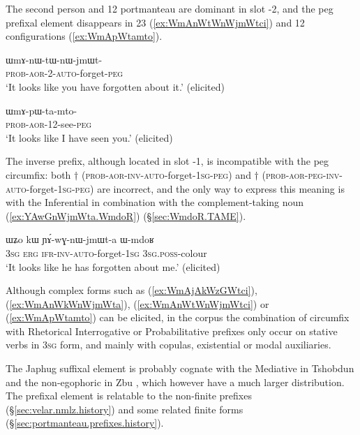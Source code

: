 The second person  and 1\fl{}2 portmanteau  are dominant in slot -2, and the peg prefixal element   disappears in 2\fl{}3 (\ref{ex:WmAnWtWnWjmWtci}) and 1\fl{}2 configurations (\ref{ex:WmApWtamto}).  

\begin{exe}
\ex \label{ex:WmAnWtWnWjmWtci}
\gll ɯmɤ-nɯ-tɯ-nɯ-jmɯt- \\
\textsc{prob}-\textsc{aor}-2-\textsc{auto}-forget-\textsc{peg} \\
\glt `It looks like you have forgotten about it.' (elicited)
\end{exe}

\begin{exe}
\ex \label{ex:WmApWtamto}
\gll ɯmɤ-pɯ-ta-mto-  \\
\textsc{prob}-\textsc{aor}-1\fl{}2-see-\textsc{peg} \\
\glt `It looks like I have seen you.' (elicited)
\end{exe}

The inverse prefix, although located in slot -1, is incompatible with the peg circumfix: both $\dagger$ (\textsc{prob}-\textsc{aor}-\textsc{inv}-\textsc{auto}-forget-\textsc{1sg}-\textsc{peg}) and $\dagger$ (\textsc{prob}-\textsc{aor}-\textsc{peg}-\textsc{inv}-\textsc{auto}-forget-\textsc{1sg}-\textsc{peg}) are incorrect, and the only way to express this meaning is with the Inferential in combination with the complement-taking noun  (\ref{ex:YAwGnWjmWta.WmdoR}) (§\ref{sec:WmdoR.TAME}).

\begin{exe}
\ex \label{ex:YAwGnWjmWta.WmdoR}
\gll ɯʑo kɯ ɲɤ́-wɣ-nɯ-jmɯt-a ɯ-mdoʁ \\
 \textsc{3sg} \textsc{erg} \textsc{ifr}-\textsc{inv}-\textsc{auto}-forget-\textsc{1sg} \textsc{3sg}.\textsc{poss}-colour  \\
\glt `It looks like he has forgotten about me.' (elicited)
\end{exe}

Although complex forms such as (\ref{ex:WmAjAkWzGWtci}), (\ref{ex:WmAnWkWnWjmWta}), (\ref{ex:WmAnWtWnWjmWtci}) or (\ref{ex:WmApWtamto}) can be elicited, in the corpus the combination of circumfix with Rhetorical Interrogative or Probabilitative prefixes only occur on stative verbs in \textsc{3sg} form, and mainly with copulas, existential or modal auxiliaries.

The Japhug  suffixal element is probably cognate with the Mediative  in Tshobdun \citep{jackson17tshobdun} and the non-egophoric  in Zbu \citep{gong18these}, which however have a much larger distribution. The  prefixal element is relatable to the non-finite  prefixes (§\ref{sec:velar.nmlz.history}) and some related finite forms (§\ref{sec:portmanteau.prefixes.history}).

